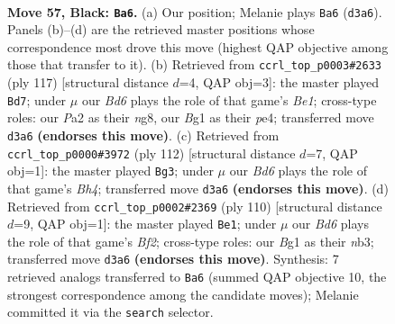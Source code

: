 \documentclass[11pt]{article}
\begin{document}
\clearpage

\begin{figure}[p]\centering
\begin{subfigure}{0.46\textwidth}\centering
\resizebox{\linewidth}{!}{%
\newchessgame
\chessboard[
  setfen={6K1/8/6p1/6k1/8/3b4/p7/6b1 b - - 1 57},
  showmover=false,
  pgfstyle=straightmove, color=movearrow, markmove={d3-a6}
]}
\caption{}
\end{subfigure}\hfill
\begin{subfigure}{0.46\textwidth}\centering
\resizebox{\linewidth}{!}{%
\newchessgame
\chessboard[
  setfen={4b1N1/8/8/7p/4P2k/8/5K2/8 b - - 15 59},
  showmover=false,
  pgfstyle=straightmove, color=movearrow, markmove={e8-d7}
]}
\caption{}
\end{subfigure}
\\[4pt]
\begin{subfigure}{0.46\textwidth}\centering
\resizebox{\linewidth}{!}{%
\newchessgame
\chessboard[
  setfen={8/8/5Pbp/k3K3/7B/8/8/8 w - - 7 57},
  showmover=false,
  pgfstyle=straightmove, color=movearrow, markmove={h4-g3}
]}
\caption{}
\end{subfigure}\hfill
\begin{subfigure}{0.46\textwidth}\centering
\resizebox{\linewidth}{!}{%
\newchessgame
\chessboard[
  setfen={8/8/5k2/8/5K2/pn4P1/5B2/8 w - - 0 56},
  showmover=false,
  pgfstyle=straightmove, color=movearrow, markmove={f2-e1}
]}
\caption{}
\end{subfigure}
\caption{\textbf{Move 57, Black: \texttt{Ba6}.} (a) Our position; Melanie plays \texttt{Ba6} (\texttt{d3a6}). Panels (b)--(d) are the retrieved master positions whose correspondence most drove this move (highest QAP objective among those that transfer to it). (b) Retrieved from \texttt{ccrl\_top\_p0003\#2633} (ply 117) [structural distance $d$=4, QAP obj=3]: the master played \texttt{Bd7}; under $\mu$ our \emph{Bd6} plays the role of that game's \emph{Be1}; cross-type roles: our \emph{P}a2 as their \emph{n}g8, our \emph{B}g1 as their \emph{p}e4; transferred move \texttt{d3a6} \textbf{(endorses this move)}. (c) Retrieved from \texttt{ccrl\_top\_p0000\#3972} (ply 112) [structural distance $d$=7, QAP obj=1]: the master played \texttt{Bg3}; under $\mu$ our \emph{Bd6} plays the role of that game's \emph{Bh4}; transferred move \texttt{d3a6} \textbf{(endorses this move)}. (d) Retrieved from \texttt{ccrl\_top\_p0002\#2369} (ply 110) [structural distance $d$=9, QAP obj=1]: the master played \texttt{Be1}; under $\mu$ our \emph{Bd6} plays the role of that game's \emph{Bf2}; cross-type roles: our \emph{B}g1 as their \emph{n}b3; transferred move \texttt{d3a6} \textbf{(endorses this move)}. Synthesis: 7 retrieved analogs transferred to \texttt{Ba6} (summed QAP objective 10, the strongest correspondence among the candidate moves); Melanie committed it via the \texttt{search} selector.}
\label{fig:thought-m113}
\end{figure}
\end{document}
